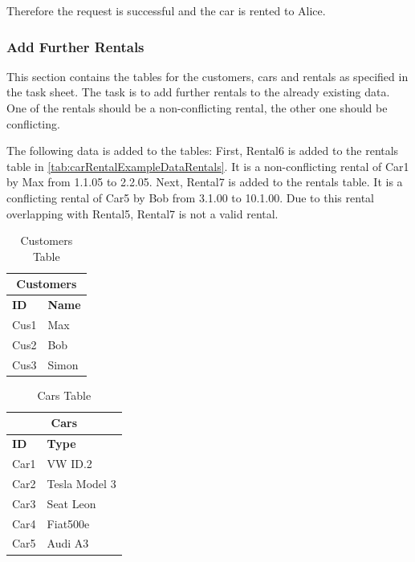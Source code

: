 Therefore the request is successful and the car is rented to Alice.

\subsubsection*{Add Further Rentals}
This section contains the tables for the customers, cars and rentals as specified in the task sheet.
The task is to add further rentals to the already existing data.
One of the rentals should be a non-conflicting rental, the other one should be conflicting.

The following data is added to the tables:
First, Rental6 is added to the rentals table in \autoref{tab:carRentalExampleDataRentals}.
It is a non-conflicting rental of Car1 by Max from 1.1.05 to 2.2.05.
Next, Rental7 is added to the rentals table.
It is a conflicting rental of Car5 by Bob from 3.1.00 to 10.1.00.
Due to this rental overlapping with Rental5, Rental7 is not a valid rental.

\begin{table}[H]
    \centering
    \caption{Customers Table}
    \label{tab:carRentalExampleDataCustomers}
    \begin{tabular}{|p{2cm}|p{2cm}|}
        \hline
        \multicolumn{2}{|c|}{\textbf{Customers}} \\
        \hline
        \textbf{ID} & \textbf{Name} \\
        \hline
        Cus1 & Max \\
        Cus2 & Bob \\
        Cus3 & Simon \\
        \hline
    \end{tabular}
\end{table}

\begin{table}[H]
    \centering
    \caption{Cars Table}
    \label{tab:carRentalExampleDataCars}
    \begin{tabular}{|p{2cm}|p{3cm}|}
        \hline
        \multicolumn{2}{|c|}{\textbf{Cars}} \\
        \hline
        \textbf{ID} & \textbf{Type} \\
        \hline
        Car1 & VW ID.2 \\
        Car2 & Tesla Model 3 \\
        Car3 & Seat Leon \\
        Car4 & Fiat500e \\
        Car5 & Audi A3 \\
        \hline
    \end{tabular}
\end{table}

